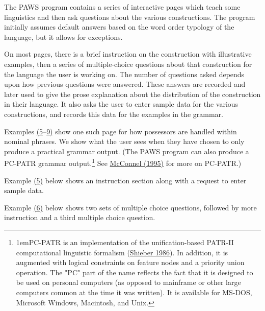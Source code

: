 \documentclass[12pt]{article}
\begin{document}
The {PAWS} program contains a series of interactive pages which teach some linguistics and then ask questions about the various constructions. The program initially assumes default answers based on the word order typology of the language, but it allows for exceptions.\par{}\indent On most pages, there is a brief instruction on the construction with illustrative examples, then a series of multiple-choice questions about that construction for the language the user is working on. The number of questions asked depends upon how previous questions were answered. These answers are recorded and later used to give the prose explanation about the distribution of the construction in their language. It also asks the user to enter sample data for the various constructions, and records this data for the examples in the grammar.\par{}\indent Examples \hyperlink{xPossesors1}{(5}–\hyperlink{xPossessors3}{9)} show one such page for how possessors are handled within nominal phrases. We show what the user sees when they have chosen to only produce a practical grammar output. (The {PAWS} program can also produce a PC-PATR grammar output.\protect\footnote[3]{{\parindent1em\protect\hypertarget{nPC-PATR}{}PC-PATR is an implementation of the unification-based PATR-II computational linguistic formalism (\hyperlink{rShieber1986}{Shieber  1986}). In addition, it is augmented with logical constraints on feature nodes and a priority union operation. The "PC" part of the name reflects the fact that it is designed to be used on personal computers (as opposed to mainframe or other large computers common at the time it was written). It is available for MS-DOS, Microsoft Windows, Macintosh, and Unix.}} See \hyperlink{rMcConnel}{McConnel (1995)} for more on PC-PATR.)\par{}\indent Example \hyperlink{xPossesors1}{(5)} below shows an instruction section along with a request to enter sample data.\par{}{\vspace{12pt}\raggedright{}
\vspace{12pt}}\par\indent Example \hyperlink{xPossessor2}{(6)} below shows two sets of multiple choice questions, followed by more instruction and a third multiple choice question.\par{}{\vspace{12pt}\raggedright{}
}
\end{document}
